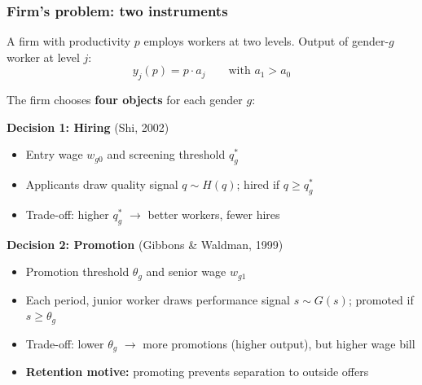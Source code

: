\documentclass[aspectratio=169, 11pt]{beamer}
\begin{document}
\begin{frame}
\frametitle{Firm's problem: two instruments}

A firm with productivity $p$ employs workers at two levels. Output of gender-$g$ worker at level $j$:
\begin{equation*}
    y_{j}(p) = p \cdot a_j \qquad \text{with } a_1 > a_0 %
\end{equation*}

The firm chooses \textbf{four objects} for each gender $g$:

\vspace{0.3cm}
\textbf{Decision 1: Hiring} \textcolor{faded}{(Shi, 2002)}
\begin{itemize}
    \item Entry wage $w_{g0}$ and screening threshold $q_g^*$
    \item Applicants draw quality signal $q \sim H(q)$; hired if $q \geq q_g^*$
    \item Trade-off: higher $q_g^*$ $\to$ better workers, fewer hires
\end{itemize}

\vspace{0.3cm}
\textbf{Decision 2: Promotion} \textcolor{faded}{(Gibbons \& Waldman, 1999)}
\begin{itemize}
    \item Promotion threshold $\theta_g$ and senior wage $w_{g1}$
    \item Each period, junior worker draws performance signal $s \sim G(s)$; promoted if $s \geq \theta_g$
    \item Trade-off: lower $\theta_g$ $\to$ more promotions (higher output), but higher wage bill
    \item \textbf{Retention motive:} promoting prevents separation to outside offers
\end{itemize}

\end{frame}
\end{document}

